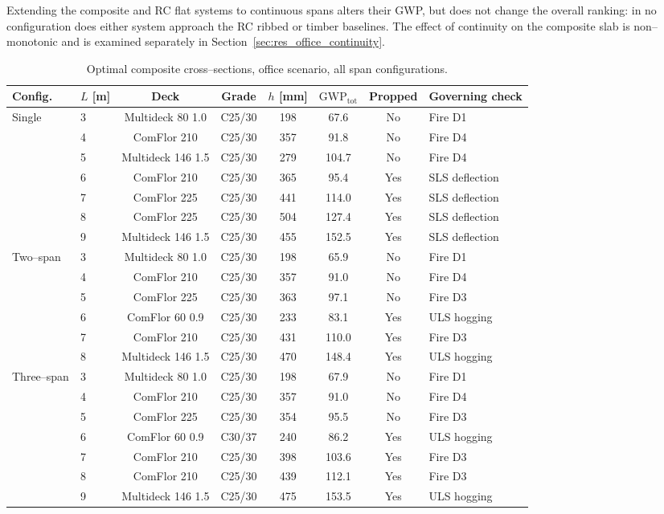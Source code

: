 Extending the composite and RC flat systems to continuous spans alters their GWP, but does not change the overall ranking: in no configuration does either system approach the RC ribbed or timber baselines. The effect of continuity on the composite slab is non--monotonic and is examined separately in Section~\ref{sec:res_office_continuity}.

\begin{table}[h!]
\small\centering
\caption{Optimal composite cross--sections, office scenario, all span configurations.}
\label{tab:office_optima}
\begin{tabular}{llcccccl}
\toprule
Config. & $L$ [m] & Deck & Grade & $h$ [mm] & $\mathrm{GWP}_\mathrm{tot}$ & Propped & Governing check \\
\midrule
\multirow{7}{*}{Single}
 & 3 & Multideck 80 1.0  & C25/30 & 198 & 67.6  & No  & Fire D1 \\
 & 4 & ComFlor 210       & C25/30 & 357 & 91.8  & No  & Fire D4 \\
 & 5 & Multideck 146 1.5 & C25/30 & 279 & 104.7 & No  & Fire D4 \\
 & 6 & ComFlor 210       & C25/30 & 365 & 95.4  & Yes & SLS deflection \\
 & 7 & ComFlor 225       & C25/30 & 441 & 114.0 & Yes & SLS deflection \\
 & 8 & ComFlor 225       & C25/30 & 504 & 127.4 & Yes & SLS deflection \\
 & 9 & Multideck 146 1.5 & C25/30 & 455 & 152.5 & Yes & SLS deflection \\
\midrule
\multirow{6}{*}{Two--span}
 & 3 & Multideck 80 1.0  & C25/30 & 198 & 65.9  & No  & Fire D1 \\
 & 4 & ComFlor 210       & C25/30 & 357 & 91.0  & No  & Fire D4 \\
 & 5 & ComFlor 225       & C25/30 & 363 & 97.1  & No  & Fire D3 \\
 & 6 & ComFlor 60 0.9    & C25/30 & 233 & 83.1  & Yes & ULS hogging \\
 & 7 & ComFlor 210       & C25/30 & 431 & 110.0 & Yes & Fire D3 \\
 & 8 & Multideck 146 1.5 & C25/30 & 470 & 148.4 & Yes & ULS hogging \\
\midrule
\multirow{7}{*}{Three--span}
 & 3 & Multideck 80 1.0  & C25/30 & 198 & 67.9  & No  & Fire D1 \\
 & 4 & ComFlor 210       & C25/30 & 357 & 91.0  & No  & Fire D4 \\
 & 5 & ComFlor 225       & C25/30 & 354 & 95.5  & No  & Fire D3 \\
 & 6 & ComFlor 60 0.9    & C30/37 & 240 & 86.2  & Yes & ULS hogging \\
 & 7 & ComFlor 210       & C25/30 & 398 & 103.6 & Yes & Fire D3 \\
 & 8 & ComFlor 210       & C25/30 & 439 & 112.1 & Yes & Fire D3 \\
 & 9 & Multideck 146 1.5 & C25/30 & 475 & 153.5 & Yes & ULS hogging \\
\bottomrule
\end{tabular}
\end{table}

